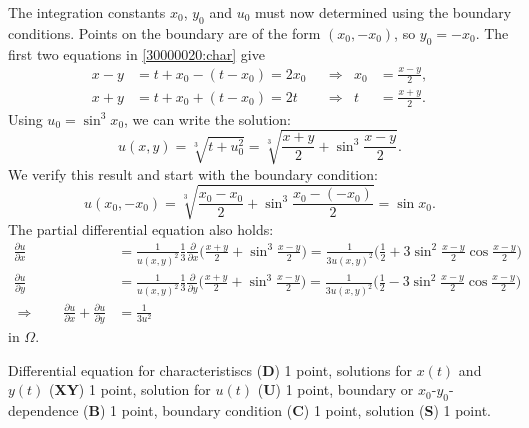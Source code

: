\begin{loesung}
The integration constants $x_0$, $y_0$ and $u_0$ must now determined
using the boundary conditions.
Points on the boundary are of the form $(x_0,-x_0)$, so $y_0=-x_0$.
The first two equations in \eqref{30000020:char} give
\begin{align*}
x-y &= t+x_0 - (t -x_0) = 2x_0
&&\Rightarrow&
x_0 &= \frac{x-y}2,
\\
x+y &= t+x_0 +(t-x_0) = 2t
&&\Rightarrow&
t&=\frac{x+y}2.
\end{align*}
Using $u_0 = \sin^3 x_0$, we can write the solution:
\[
u(x,y)
=
\sqrt[3]{t+u_0^2}
=
\sqrt[3]{\frac{x+y}2 + \sin^3\frac{x-y}2}.
\]
We verify this result and start with the boundary condition:
\[
u(x_0,-x_0)
= 
\sqrt[3]{\frac{x_0-x_0}2 + \sin^3\frac{x_0-(-x_0)}2}
=
\sin x_0.
\]
The partial differential equation also holds:
\begin{align*}
\frac{\partial u}{\partial x}
&=
\frac{1}{u(x,y)^2} \frac13
\frac{\partial}{\partial x} \biggl(
\frac{x+y}2 + \sin^3\frac{x-y}2
\biggr)
=
\frac{1}{3u(x,y)^2} \biggl(
\frac12 + 3\sin^2\frac{x-y}2\cos\frac{x-y}2
\biggr)
\\
\frac{\partial u}{\partial y}
&=
\frac{1}{u(x,y)^2} \frac13
\frac{\partial}{\partial y} \biggl(
\frac{x+y}2 + \sin^3\frac{x-y}2
\biggr)
=
\frac{1}{3u(x,y)^2} \biggl(
\frac12 - 3\sin^2\frac{x-y}2\cos\frac{x-y}2
\biggr)
\\
\Rightarrow\qquad
\frac{\partial u}{\partial x} + \frac{\partial u}{\partial y}
&=
\frac{1}{3u^2}
\end{align*}
in $\Omega$.
\end{loesung}

\begin{bewertung}
Differential equation for characteristiscs ({\bf D}) 1 point,
solutions for $x(t)$ and $y(t)$ ({\bf XY}) 1 point,
solution for $u(t)$ ({\bf U}) 1 point,
boundary or $x_0$-$y_0$-dependence ({\bf B}) 1 point,
boundary condition ({\bf C}) 1 point,
solution ({\bf S}) 1 point.
\end{bewertung}
